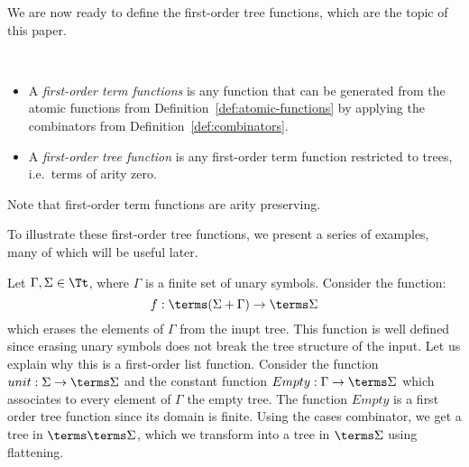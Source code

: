 We are now ready to define the first-order tree functions, which are the topic of this paper. 

\begin{definition} \label{def:fo-tree-functions} \ 
    \begin{itemize}
        \item A \emph{first-order term functions} is any function that can be  generated from the atomic functions from Definition~\ref{def:atomic-functions} by applying the  combinators from Definition~\ref{def:combinators}.
        \item  A \emph{first-order tree function} is any first-order term function restricted to trees, i.e.~terms of arity zero.
    \end{itemize}    
\end{definition}
Note that first-order term functions are arity preserving. 

To illustrate these first-order tree functions, we present a series of examples, many of which will be useful later.

\bigskip
%
%
\noindent\begin{example}[Filter] Let $\Gamma, \Sigma\in\Tt$, where $\Gamma$ is a finite set of unary symbols. Consider the function:
$$ f:\terms (\Sigma+\Gamma)\to\terms \Sigma$$
which erases the elements of $\Gamma$ from the inupt tree. This function is well defined since erasing unary symbols does not break the tree structure of the input. 
Let us explain why this is a first-order list function. 
Consider the function $unit:\Sigma\to\terms\Sigma$ and the constant function $Empty:\Gamma\to\terms\Sigma$ which associates to every element of $\Gamma$ the empty tree. The function $Empty$ is a first order tree function since its domain is finite. Using the cases combinator, we get a tree in $\terms\terms\Sigma$, which we transform into a tree in $\terms \Sigma$ using flattening.
\end{example}

